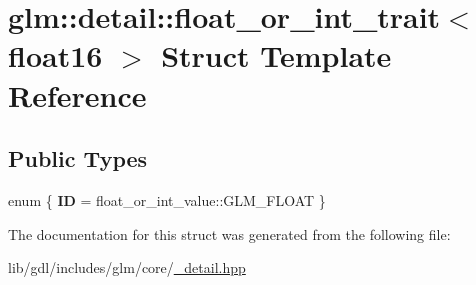 \hypertarget{structglm_1_1detail_1_1float__or__int__trait_3_01float16_01_4}{}\section{glm\+:\+:detail\+:\+:float\+\_\+or\+\_\+int\+\_\+trait$<$ float16 $>$ Struct Template Reference}
\label{structglm_1_1detail_1_1float__or__int__trait_3_01float16_01_4}
\subsection*{Public Types}
\begin{DoxyCompactItemize}
\item 
\hypertarget{structglm_1_1detail_1_1float__or__int__trait_3_01float16_01_4_a52b4a5f6de52fce5ec6be38d88ba1fa3}{}enum \{ {\bfseries I\+D} = float\+\_\+or\+\_\+int\+\_\+value\+:\+:G\+L\+M\+\_\+\+F\+L\+O\+A\+T
 \}\label{structglm_1_1detail_1_1float__or__int__trait_3_01float16_01_4_a52b4a5f6de52fce5ec6be38d88ba1fa3}

\end{DoxyCompactItemize}


The documentation for this struct was generated from the following file\+:\begin{DoxyCompactItemize}
\item 
lib/gdl/includes/glm/core/\hyperlink{__detail_8hpp}{\+\_\+detail.\+hpp}\end{DoxyCompactItemize}
